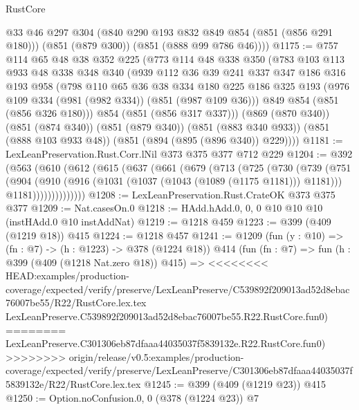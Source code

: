 \begin{lexlean}{RustCore}
\begin{coremodule}
{\begin{coremodule}
{{{{{        @33
        @46
        @297
        @304
        (@840 @290 @193 @832 @849 @854 (@851 (@856 @291 @180)))
        (@851 (@879 @300))
        (@851 (@888 @99 @786 @46))))
@1175 := @757
    @114
    @65
    @48
    @38
    @352
    @225
    (@773
      @114
      @48
      @338
      @350
      (@783
        @103
        @113
        @933
        @48
        @338
        @348
        @340
        (@939
          @112
          @36
          @39
          @241
          @337
          @347
          @186
          @316
          @193
          @958
          (@798
            @110
            @65
            @36
            @38
            @334
            @180
            @225
            @186
            @325
            @193
            (@976 @109 @334 (@981 (@982 @334)) (@851 (@987 @109 @36)))
            @849
            @854
            (@851 (@856 @326 @180)))
          @854
          (@851 (@856 @317 @337)))
        (@869 (@870 @340))
        (@851 (@874 @340))
        (@851 (@879 @340))
        (@851 (@883 @340 @933))
        (@851 (@888 @103 @933 @48))
        (@851 (@894 (@895 (@896 @340)) @229))))
@1181 := LexLeanPreservation.Rust.Corr.lNil @373 @375 @377 @712 @229
@1204 := @392
    (@563
      (@610
        (@612
          (@615
            (@637
              (@661
                (@679
                  (@713
                    (@725
                      (@730
                        (@739
                          (@751
                            (@904
                              (@910
                                (@916 (@1031 (@1037 (@1043 (@1089 (@1175 @1181))) @1181)))
                                @1181))))))))))))))
@1208 := LexLeanPreservation.Rust.CrateOK @373 @375 @377
@1209 := Nat.casesOn.{0}
@1218 := HAdd.hAdd.{0, 0, 0} @10 @10 @10 (instHAdd.{0} @10 instAddNat)
@1219 := @1218 @459
@1223 := @399 (@409 (@1219 @18)) @415
@1224 := @1218 @457
@1241 := @1209
    (fun (y : @10) => (fn : @7) -> (h : @1223) -> @378 (@1224 @18))
    @414
    (fun (fn : @7) =>
    fun (h : @399 (@409 (@1218 Nat.zero @18)) @415) =>
<<<<<<<< HEAD:examples/production-coverage/expected/verify/preserve/LexLeanPreserve/C539892f209013ad52d8ebac76007be55/R22/RustCore.lex.tex
    LexLeanPreserve.C539892f209013ad52d8ebac76007be55.R22.RustCore.fun0)
========
    LexLeanPreserve.C301306eb87dfaaa44035037f5839132e.R22.RustCore.fun0)
>>>>>>>> origin/release/v0.5:examples/production-coverage/expected/verify/preserve/LexLeanPreserve/C301306eb87dfaaa44035037f5839132e/R22/RustCore.lex.tex
@1245 := @399 (@409 (@1219 @23)) @415
@1250 := Option.noConfusion.{0, 0} (@378 (@1224 @23)) @7
}}}}}
\end{coremodule}}
\end{coremodule}
\end{lexlean}

